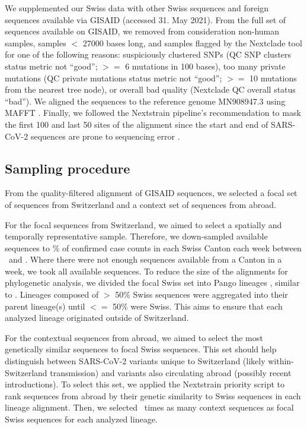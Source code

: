 \documentclass[9pt,twoside,lineno]{pnas-new}
\begin{document}
We supplemented our Swiss data with other Swiss sequences and foreign sequences available via GISAID (accessed 31. May 2021). From the full set of sequences available on GISAID, we removed from consideration non-human samples, samples $<$ 27000 bases long, and samples flagged by the Nextclade tool \cite{Aksamentov} for one of the following reasons: suspiciously clustered SNPs (QC SNP clusters status metric not ``good''; $>=$ 6 mutations in 100 bases), too many private mutations (QC private mutations status metric not ``good''; $>=$ 10 mutations from the nearest tree node), or overall bad quality (Nextclade QC overall status ``bad''). We aligned the sequences to the reference genome MN908947.3 using MAFFT \cite{katoh_mafft:_2002}. Finally, we followed the Nextstrain pipeline's recommendation to mask the first 100 and last 50 sites of the alignment \cite{Nextstraina} since the start and end of SARS-CoV-2 sequences are prone to sequencing error \cite{DeMaio2020}.

\subsection{Sampling procedure}

From the quality-filtered alignment of GISAID sequences, we selected a focal set of sequences from Switzerland and a context set of sequences from abroad. 

For the focal sequences from Switzerland, we aimed to select a spatially and temporally representative sample. Therefore, we down-sampled available sequences to \fpeval{\maxsamplingpercent}\% of confirmed case counts in each Swiss Canton each week between \mindate\ and \maxdate. Where there were not enough sequences available from a Canton in a week, we took all available sequences. To reduce the size of the alignments for phylogenetic analysis, we divided the focal Swiss set into Pango lineages \cite{Rambaut}, similar to \cite{DuPlessis2021}. Lineages composed of $>$ 50\% Swiss sequences were aggregated into their parent lineage(s) until $<=$ 50\% were Swiss. This aims to ensure that each analyzed lineage originated outside of Switzerland.

For the contextual sequences from abroad, we aimed to select the most genetically similar sequences to focal Swiss sequences. This set should help distinguish between SARS-CoV-2 variants unique to Switzerland (likely within-Switzerland transmission) and variants also circulating abroad (possibly recent introductions). To select this set, we applied the Nextstrain priority script \cite{Nextstrainteam} to rank sequences from abroad by their genetic similarity to Swiss sequences in each lineage alignment. Then, we selected \similaritycontextscalefactor\ times as many  context sequences as focal Swiss sequences for each analyzed lineage. 
\end{document}
